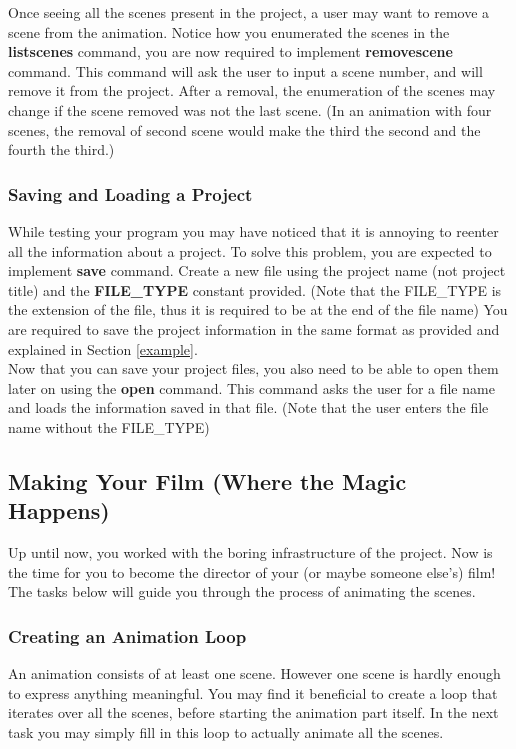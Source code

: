 \documentclass[a4paper]{article}
\begin{document}
	Once seeing all the scenes present in the project, a user may want to remove a scene from the animation. Notice how you enumerated the scenes in the \textbf{listscenes} command, you are now required to implement \textbf{removescene} command. This command will ask the user to input a scene number, and will remove it from the project. After a removal, the enumeration of the scenes may change if the scene removed was not the last scene. (In an animation with four scenes, the removal of second scene would make the third the second and the fourth the third.) \\
	
	\subsubsection{Saving and Loading a Project}

	While testing your program you may have noticed that it is annoying to reenter all the information about a project. To solve this problem, you are expected to implement \textbf{save} command. Create a new file using the project name (not project title) and the \textbf{FILE\_TYPE} constant provided. (Note that the FILE\_TYPE is the extension of the file, thus it is required to be at the end of the file name) You are required to save the project information in the same format as provided and explained in Section \ref{example}. \\
	
	Now that you can save your project files, you also need to be able to open them later on using the \textbf{open} command. This command asks the user for a file name and loads the information saved in that file. (Note that the user enters the file name without the FILE\_TYPE)
	
	\subsection{Making Your Film (Where the Magic Happens)}
	Up until now, you worked with the boring infrastructure of the project. Now is the time for you to become the director of your (or maybe someone else's) film! The tasks below will guide you through the process of animating the scenes.
 	
	\subsubsection{Creating an Animation Loop}
	An animation consists of at least one scene. However one scene is hardly enough to express anything meaningful. You may find it beneficial to create a loop that iterates over all the scenes, before starting the animation part itself. In the next task you may simply fill in this loop to actually animate all the scenes.
	
\end{document}
